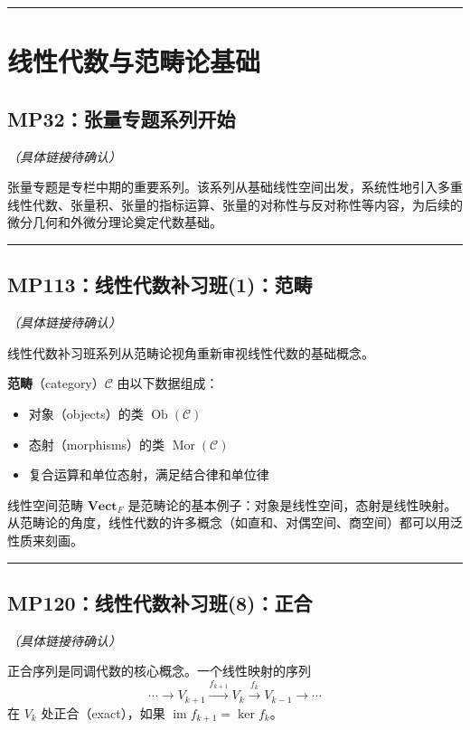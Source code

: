 \documentclass[10pt, openany]{book}
\begin{document}
\medskip
\noindent\rule{\textwidth}{0.4pt}

\chapter{线性代数与范畴论基础}

\section{MP32：张量专题系列开始}
\label{sec:mp32}

\textit{（具体链接待确认）}

张量专题是专栏中期的重要系列。该系列从基础线性空间出发，系统性地引入多重线性代数、张量积、张量的指标运算、张量的对称性与反对称性等内容，为后续的微分几何和外微分理论奠定代数基础。

\medskip
\noindent\rule{\textwidth}{0.4pt}

\section{MP113：线性代数补习班(1)：范畴}
\label{sec:mp113}

\textit{（具体链接待确认）}

线性代数补习班系列从范畴论视角重新审视线性代数的基础概念。

\textbf{范畴}（category）$\mathcal{C}$ 由以下数据组成：
\begin{itemize}
    \item 对象（objects）的类 $\operatorname{Ob}(\mathcal{C})$
    \item 态射（morphisms）的类 $\operatorname{Mor}(\mathcal{C})$
    \item 复合运算和单位态射，满足结合律和单位律
\end{itemize}

线性空间范畴 $\textbf{Vect}_F$ 是范畴论的基本例子：对象是线性空间，态射是线性映射。从范畴论的角度，线性代数的许多概念（如直和、对偶空间、商空间）都可以用泛性质来刻画。

\medskip
\noindent\rule{\textwidth}{0.4pt}

\section{MP120：线性代数补习班(8)：正合}
\label{sec:mp120}

\textit{（具体链接待确认）}

正合序列是同调代数的核心概念。一个线性映射的序列
\[
\cdots \to V_{k+1} \xrightarrow{f_{k+1}} V_k \xrightarrow{f_k} V_{k-1} \to \cdots
\]
在 $V_k$ 处正合（exact），如果 $\operatorname{im} f_{k+1} = \ker f_k$。
\end{document}

